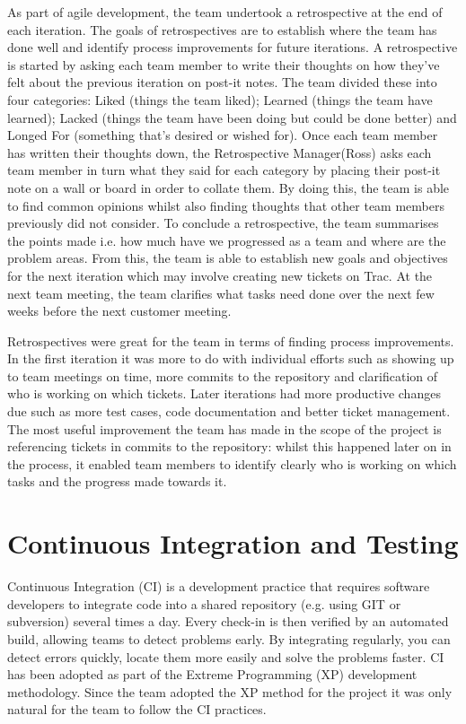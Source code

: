\documentclass{l3proj}
\begin{document}
As part of agile development, the team undertook a retrospective at the end of each iteration. The goals of retrospectives are
to establish where the team has done well and identify process improvements for future iterations. A retrospective is started
by asking each team member to write their thoughts on how they've felt about the previous iteration on post-it notes.
The team divided these into four categories: Liked (things the team liked); Learned (things the team have learned);
Lacked (things the team have been doing but could be done better) and Longed For (something that's desired or wished for).
Once each team member has written their thoughts down, the Retrospective Manager(Ross) asks each team member in turn
what they said for each category by placing their post-it note on a wall or board in order to collate them. By doing this,
the team is able to find common opinions whilst also finding thoughts that other team members previously did not
consider. To conclude a retrospective, the team summarises the points made i.e. how much have we progressed as a team
and where are the problem areas. From this, the team is able to establish new goals and objectives for the next iteration
which may involve creating new tickets on Trac. At the next team meeting, the team clarifies what tasks need done over
the next few weeks before the next customer meeting.

Retrospectives were great for the team in terms of finding process improvements. In the first iteration it was more to
do with individual efforts such as showing up to team meetings on time, more commits to the repository and clarification
of who is working on which tickets. Later iterations had more productive changes due such as more test cases, code
documentation and better ticket management. The most useful improvement the team has made in the scope of the project
is referencing tickets in commits to the repository: whilst this happened later on in the process, it enabled team members
to identify clearly who is working on which tasks and the progress made towards it.


\section{Continuous Integration and Testing}
\label{sec:continuous-integration}

Continuous Integration (CI) is a development practice that requires software developers to integrate code into a shared
repository (e.g. using GIT or subversion) several times a day. Every check-in is then verified by an automated build,
allowing teams to detect problems early. By integrating regularly, you can detect errors quickly, locate them more easily
and solve the problems faster. CI has been adopted as part of the Extreme Programming (XP) development methodology.
Since the team adopted the XP method for the project it was only natural for the team to follow the CI practices.
\end{document}
